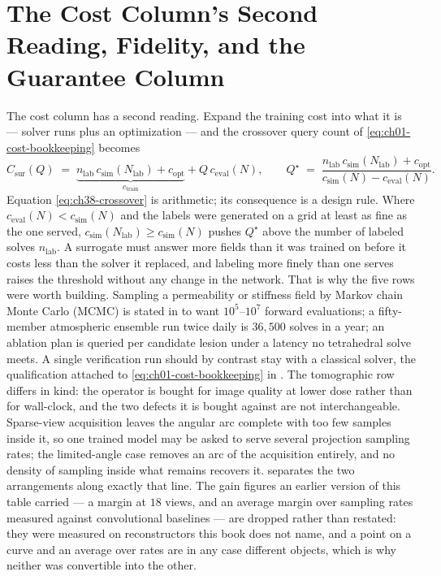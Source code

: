 \section{The Cost Column's Second Reading, Fidelity, and the Guarantee Column}
\label{sec:ch38-columns}

The cost column has a second reading. Expand the training cost into what it is --- solver runs
plus an optimization --- and the crossover query count of
\eqref{eq:ch01-cost-bookkeeping} becomes
\begin{equation}
  C_{\mathrm{sur}}(Q)
  \;=\;
  \underbrace{n_{\mathrm{lab}}\,c_{\mathrm{sim}}(N_{\mathrm{lab}}) + c_{\mathrm{opt}}}_{c_{\mathrm{train}}}
  + Q\,c_{\mathrm{eval}}(N),
  \qquad
  Q^{\star}
  \;=\;
  \frac{n_{\mathrm{lab}}\,c_{\mathrm{sim}}(N_{\mathrm{lab}}) + c_{\mathrm{opt}}}
       {c_{\mathrm{sim}}(N) - c_{\mathrm{eval}}(N)}.
  \label{eq:ch38-crossover}
\end{equation}
Equation \eqref{eq:ch38-crossover} is arithmetic; its consequence is a design rule. Where
$c_{\mathrm{eval}}(N)<c_{\mathrm{sim}}(N)$ and the labels were generated on a grid at least
as fine as the one served, $c_{\mathrm{sim}}(N_{\mathrm{lab}})\ge c_{\mathrm{sim}}(N)$ pushes
$Q^{\star}$ above the number of labeled solves $n_{\mathrm{lab}}$. A surrogate must answer
more fields than it was trained on before it costs less than the solver it replaced, and
labeling more finely than one serves raises the threshold without any change in the network.
That is why the five rows were worth building. Sampling a permeability or stiffness field by
Markov chain Monte Carlo (MCMC) is stated in
 to want $10^{5}$--$10^{7}$
forward evaluations; a fifty-member atmospheric ensemble run twice daily is $36{,}500$ solves
in a year; an ablation plan is queried per candidate lesion under a latency no tetrahedral
solve meets. A single verification run should by contrast stay with a classical
solver, the qualification attached to \eqref{eq:ch01-cost-bookkeeping} in
. The tomographic row differs in
kind: the operator is bought for image quality at lower dose rather than for wall-clock, and
the two defects it is bought against are not interchangeable. Sparse-view acquisition leaves
the angular arc complete with too few samples inside it, so one trained model may be asked
to serve several projection sampling rates; the limited-angle case removes an arc of the
acquisition entirely, and no density of sampling inside what remains recovers it.
 separates the two
arrangements along exactly that line. The gain figures an earlier version of this table
carried --- a margin at $18$ views, and an average margin over sampling rates measured
against convolutional baselines --- are dropped rather than restated: they were measured on
reconstructors this book does not name, and a point on a curve and an average over rates
are in any case different objects, which is why neither was convertible into the other.

